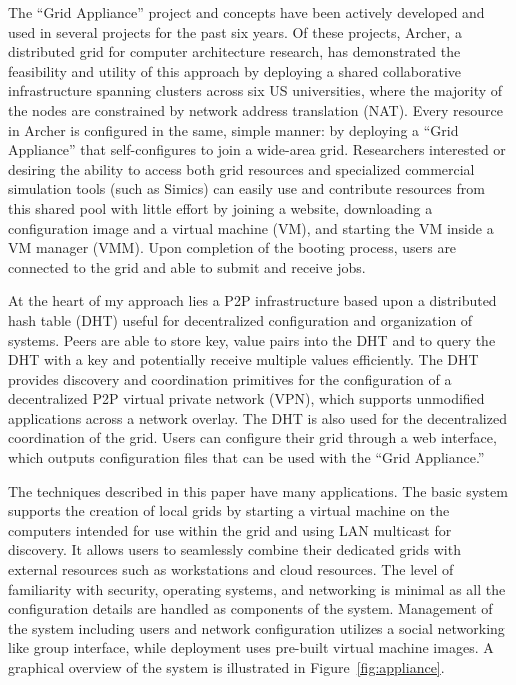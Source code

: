 The ``Grid Appliance'' project and concepts have been actively developed and
used in several projects for the past six years.  Of these projects, Archer, a
distributed grid for computer architecture research,
has demonstrated the feasibility and utility of this approach by
deploying a shared collaborative infrastructure spanning clusters across six US
universities, where the majority of the nodes are constrained by network
address translation (NAT).  Every resource in Archer is configured in the same,
simple manner:  by deploying a ``Grid Appliance'' that self-configures to join a
wide-area grid.  Researchers interested or desiring the ability to access both
grid resources and specialized commercial simulation tools (such as Simics) can
easily use and contribute resources from this shared pool with little effort
by joining a website, downloading a configuration image and a virtual
machine (VM), and starting the VM inside a VM manager (VMM).  Upon completion of
the booting process, users are connected to the grid and able to submit and
receive jobs.

At the heart of my approach lies a P2P infrastructure based upon a distributed
hash table (DHT) useful for decentralized configuration and organization of
systems.  Peers are able to store key, value pairs into the DHT and to query
the DHT with a key and potentially receive multiple values efficiently.  The
DHT provides discovery and coordination primitives for the configuration of a
decentralized P2P virtual private network (VPN), which supports unmodified
applications across a network overlay.  The DHT is also used for the
decentralized coordination of the grid.  Users can configure their grid through
a web interface, which outputs configuration files that can be used with the
``Grid Appliance.''

The techniques described in this paper have many applications.  The basic
system supports the creation of local grids by starting a virtual machine on
the computers intended for use within the grid and using LAN multicast for
discovery.  It allows users to seamlessly combine their dedicated grids with
external resources such as workstations and cloud resources.  The level of
familiarity with security, operating systems, and networking is minimal as all
the configuration details are handled as components of the system.  Management
of the system including users and network configuration utilizes a social
networking like group interface, while deployment uses pre-built virtual
machine images.  A graphical overview of the system is illustrated in
Figure~\ref{fig:appliance}.

